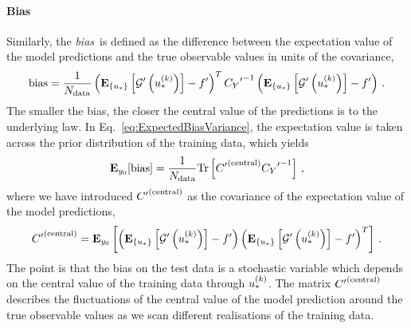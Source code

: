 

\paragraph{Bias}

Similarly, the {\em bias}\ is defined as the difference between the expectation
value of the model predictions and the true observable values in units of the
covariance, \ie 
\begin{equation}
    \label{eq:BiasDef}
    {\rm bias} = \frac{1}{N_{\rm data}}
    \left( \mathbf{E}_{\{ u_* \}} \left[ {{\mathcal{G}}^{\prime}}\left(u_*^{(k)}\right) \right] - {{f}^{\prime}} \right)^T
    {{C_{Y}}^{\prime}}^{-1}
    \left( \mathbf{E}_{\{ u_* \}} \left[ {{\mathcal{G}}^{\prime}}\left(u_*^{(k)}\right) \right] - {{f}^{\prime}} \right)\, .
\end{equation}
The smaller the bias, the closer the central value of the predictions is to the
underlying law. In Eq.~\ref{eq:ExpectedBiasVariance}, the expectation value is
taken across the prior distribution of the training data, which yields
\begin{equation}
    \mathbf{E}_{y_0}[{\rm bias}] = \frac{1}{N_{\rm data}}
    {\rm Tr} \left[ {{C}^{\prime}}^{(\rm central)} {{C_{Y}}^{\prime}}^{-1} \right]\, ,
\end{equation}
where we have introduced ${{C}^{\prime}}^{(\rm central)}$ as the covariance of the expectation value
of the model predictions,
\begin{equation}
    \label{eq:CovCentDef}
    {{C}^{\prime}}^{(\rm central)} = 
    \mathbf{E}_{y_0}\left[
        \left( \mathbf{E}_{\{ u_* \}} \left[ {{\mathcal{G}}^{\prime}}\left(u_*^{(k)}\right) \right] - {{f}^{\prime}} \right)
        \left( \mathbf{E}_{\{ u_* \}} \left[ {{\mathcal{G}}^{\prime}}\left(u_*^{(k)}\right) \right] - {{f}^{\prime}} \right)^T   
    \right]\, .
\end{equation}
The point is that the bias on the test data is a stochastic variable which
depends on the central value of the training data through $u_*^{(k)}$. The
matrix ${{C}^{\prime}}^{(\rm central)}$ describes the fluctuations of the central value of the model
prediction around the true observable values as we scan different realisations
of the training data. 

